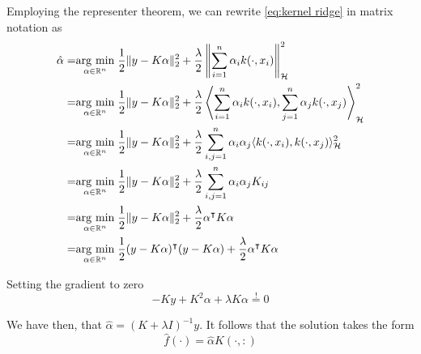 Employing the representer theorem, we can rewrite \ref{eq:kernel ridge} in matrix notation as
\begin{equation}
    \begin{aligned}
    \hat{\alpha}=&\underset{\alpha \in \mathbb{R}^n}{\operatorname{arg}\,\operatorname{min}}\;\frac{1}{2}\|y-K\alpha\|_2^2+\frac{\lambda}{2}\left\|\sum _{i=1}^{n}\alpha _{i}k(\cdot ,x_{i})\right\|_{\mathcal{H}}^2
    \\
    =&\underset{\alpha \in \mathbb{R}^n}{\operatorname{arg}\,\operatorname{min}}\;\frac{1}{2}\|y-K\alpha\|_2^2+\frac{\lambda}{2} \left\langle \sum _{i=1}^{n}\alpha _{i}k(\cdot ,x_{i}),\sum _{j=1}^{n}\alpha _{j}k(\cdot ,x_{j})\right\rangle_{\mathcal{H}}^2
    \\
    =&\underset{\alpha \in \mathbb{R}^n}{\operatorname{arg}\,\operatorname{min}}\;\frac{1}{2}\|y-K\alpha\|_2^2+\frac{\lambda}{2} \sum _{i,j=1}^{n}\alpha _{i}\alpha _{j}\langle k(\cdot ,x_{i}),k(\cdot ,x_{j})\rangle_{\mathcal{H}}^2
    \\
    =&\underset{\alpha \in \mathbb{R}^n}{\operatorname{arg}\,\operatorname{min}}\;\frac{1}{2}\|y-K\alpha\|_2^2+\frac{\lambda}{2} \sum _{i,j=1}^{n}\alpha _{i}\alpha _{j}K_{ij}
    \\
    =&\underset{\alpha \in \mathbb{R}^n}{\operatorname{arg}\,\operatorname{min}}\;\frac{1}{2}\|y-K\alpha\|_2^2+\frac{\lambda}{2} \alpha^\intercal K \alpha
    \\
    =&\underset{\alpha \in \mathbb{R}^n}{\operatorname{arg}\,\operatorname{min}}\;\frac{1}{2}(y-K\alpha)^\intercal (y-K\alpha)+\frac{\lambda}{2} \alpha^\intercal K \alpha
\end{aligned}
\end{equation}

Setting the gradient to zero
\begin{equation}
    -Ky+K^2\alpha+\lambda K \alpha\overset{!}{=}0
\end{equation}

We have then, that $\hat{\alpha}=(K+\lambda I)^{-1}y$. It follows that the solution takes the form
\begin{equation}
    \hat{f}(\cdot)=\hat{\alpha}K(\cdot,:)
\end{equation}

